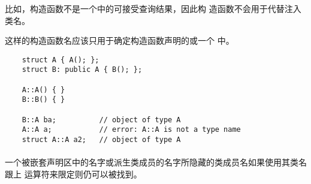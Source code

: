 \begin{note}
  比如，构造函数不是一个中的可接受查询结果，因此构
  造函数不会用于代替注入类名。
\end{note}

这样的构造函数名应该只用于确定构造函数声明的或一个
中。

\begin{example}
  \begin{lstlisting}
    struct A { A(); };
    struct B: public A { B(); };

    A::A() { }
    B::B() { }

    B::A ba;          // object of type A
    A::A a;           // error: A::A is not a type name
    struct A::A a2;   // object of type A
  \end{lstlisting}
\end{example}

\paragraph{} %
一个被嵌套声明区中的名字或派生类成员的名字所隐藏的类成员名如果使用其类名跟上
\tm{::}运算符来限定则仍可以被找到。
